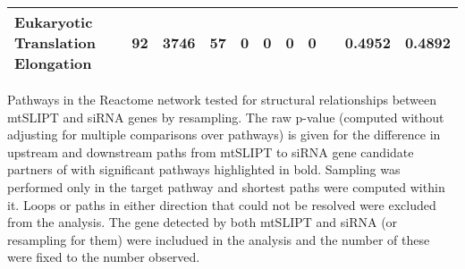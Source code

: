 \begin{table*}[!htb]
{{\begin{threeparttable}
\begin{tabular}{l|cc|cc|cccc|cc}
  \rowcolor{black!5}
Eukaryotic Translation Elongation         & 92    & 3746   & 57   & 0     & 0    & 0    & 0       &                   & 0.4952 & 0.4892   \\ 
\hline
\end{tabular}
\begin{tablenotes}
\raggedright \small
Pathways in the Reactome network tested for structural relationships between \acrshort{mtSLIPT} and \gls{siRNA} genes by resampling. The raw p-value (computed without adjusting for multiple comparisons over pathways) is given for the difference in upstream and downstream paths from \acrshort{mtSLIPT} to \gls{siRNA} gene candidate partners of  with significant pathways highlighted in bold. Sampling was performed only in the target pathway and shortest paths were computed within it. Loops or paths in either direction that could not be resolved were excluded from the analysis. The gene detected by both \acrshort{mtSLIPT} and \gls{siRNA} (or resampling for them) were includued in the analysis and the number of these were fixed to the number observed.
\end{tablenotes}
\end{threeparttable}
}
}
\end{table*}


\FloatBarrier
